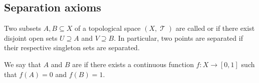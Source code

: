 \subsection{Separation axioms}\label{subsec:separation_axioms}

\begin{definition}\label{def:topological_space_separation}
  Two subsets \( A, B \subseteq X \) of a topological space \( (X, \mscrT) \) are called  or  if there exist disjoint open sets \( U \supseteq A \) and \( V \supseteq B \). In particular, two points are separated if their respective singleton sets are separated.

  We say that \( A \) and \( B \) are  if there exists a continuous function \( f: X \to [0, 1] \) such that \( f(A) = 0 \) and \( f(B) = 1 \).
\end{definition}

